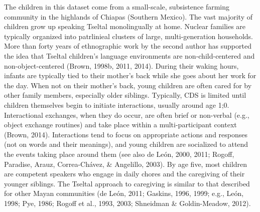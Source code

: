 \documentclass[floatsintext,man]{apa6}
\theoremstyle{definition}
\theoremstyle{definition}
\theoremstyle{definition}
\theoremstyle{remark}
\begin{document}
The children in this dataset come from a small-scale, subsistence
farming community in the highlands of Chiapas (Southern Mexico). The
vast majority of children grow up speaking Tseltal monolingually at
home. Nuclear families are typically organized into patrlinieal clusters
of large, multi-generation households. More than forty years of
ethnographic work by the second author has supported the idea that
Tseltal children's language environments are non-child-centered and
non-object-centered (Brown, 1998b, 2011, 2014). During their waking
hours, infants are typically tied to their mother's back while she goes
about her work for the day. When not on their mother's back, young
children are often cared for by other family members, especially older
siblings. Typically, CDS is limited until children themselves begin to
initiate interactions, usually around age 1;0. Interactional exchanges,
when they do occur, are often brief or non-verbal (e.g., object exchange
routines) and take place within a multi-participant context (Brown,
2014). Interactions tend to focus on appropriate actions and responses
(not on words and their meanings), and young children are socialized to
attend the events taking place around them (see also de León, 2000,
2011; Rogoff, Paradise, Arauz, Correa-Chávez, \& Angelillo, 2003). By
age five, most children are competent speakers who engage in daily
chores and the caregiving of their younger siblings. The Tseltal
approach to caregiving is similar to that described for other Mayan
communities (de León, 2011; Gaskins, 1996, 1999; e.g., León, 1998; Pye,
1986; Rogoff et al., 1993, 2003; Shneidman \& Goldin-Meadow, 2012).
\end{document}
